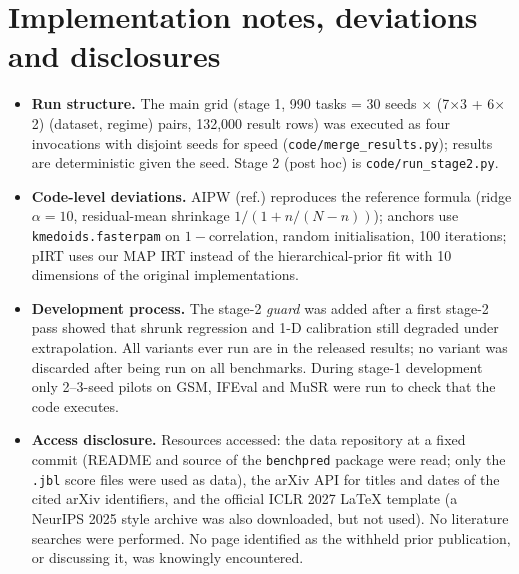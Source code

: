 \documentclass{article}
\begin{document}
\section{Implementation notes, deviations and disclosures}
\label{app:repro}
\begin{itemize}
\item \textbf{Run structure.} The main grid (stage 1, 990 tasks = 30 seeds $\times$ (7$\times$3 + 6$\times$2) (dataset, regime) pairs, 132{,}000 result rows) was executed as four invocations with disjoint seeds for speed (\texttt{code/merge\_results.py}); results are deterministic given the seed. Stage 2 (post hoc) is \texttt{code/run\_stage2.py}.
\item \textbf{Code-level deviations.} AIPW (ref.) reproduces the reference formula (ridge $\alpha{=}10$, residual-mean shrinkage $1/(1+n/(N-n))$); anchors use \texttt{kmedoids.fasterpam} on $1-$correlation, random initialisation, 100 iterations; pIRT uses our MAP IRT instead of the hierarchical-prior fit with 10 dimensions of the original implementations.
\item \textbf{Development process.} The stage-2 \emph{guard} was added after a first stage-2 pass showed that shrunk regression and 1-D calibration still degraded under extrapolation. All variants ever run are in the released results; no variant was discarded after being run on all benchmarks. During stage-1 development only 2--3-seed pilots on GSM, IFEval and MuSR were run to check that the code executes.
\item \textbf{Access disclosure.} Resources accessed: the data repository at a fixed commit (README and source of the \texttt{benchpred} package were read; only the \texttt{.jbl} score files were used as data), the arXiv API for titles and dates of the cited arXiv identifiers, and the official ICLR 2027 LaTeX template (a NeurIPS 2025 style archive was also downloaded, but not used). No literature searches were performed. No page identified as the withheld prior publication, or discussing it, was knowingly encountered.
\end{itemize}
\end{document}

